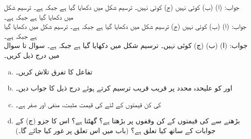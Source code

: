 جواب:\quad
(ا)  (ب) کوئی نہیں (ج) کوئی نہیں۔
ترسیم شکل  میں دکھایا گیا ہے جبکہ  ہے۔
ترسیم شکل  میں دکھایا گیا ہے جبکہ  ہے۔\\
جواب:\quad
(ا)  (ب) کوئی نہیں (ج) 
ترسیم شکل  میں دکھایا گیا ہے جبکہ  ہے۔
ترسیم شکل  میں دکھایا گیا ہے جبکہ  ہے۔\\
جواب:\quad
(ا)  (ب)  (ج) کوئی نہیں۔
ترسیم شکل  میں دکھایا گیا ہے جبکہ  ہے۔
سوال  تا سوال  میں درج ذیل کریں۔
\begin{enumerate}[a.]

\item
تفاعل  کا تفرق  تلاش کریں۔
\item
{} اور  کو علیحدہ محدد پر قریب قریب ترسیم کرتے ہوئے درج ذیل کا جواب دیں۔
\item
{} کی کن قیمتوں کے لئے   کی قیمت  مثبت، منفی اور صفر ہے۔
\item
{} بڑھنے سے  کی قیمتوں کے کن وقفوں پر  بڑھتا ہے؟ گھٹتا ہے؟ اس کا جزو (ج) کے جوابات کے ساتھ کیا تعلق ہے؟ (باب  میں اس تعلق پر غور کیا جائے گا۔)
\end{enumerate} 

